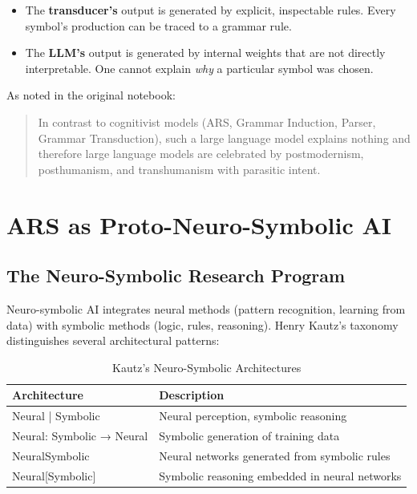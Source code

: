 \documentclass[12pt,a4paper]{article}
\begin{document}
\begin{itemize}
    \item The \textbf{transducer's} output is generated by explicit, inspectable 
    rules. Every symbol's production can be traced to a grammar rule.
    \item The \textbf{LLM's} output is generated by internal weights that are 
    not directly interpretable. One cannot explain \textit{why} a particular 
    symbol was chosen.
\end{itemize}

As noted in the original notebook:

\blockquote{In contrast to cognitivist models (ARS, Grammar Induction, Parser, 
Grammar Transduction), such a large language model explains nothing and 
therefore large language models are celebrated by postmodernism, posthumanism, 
and transhumanism with parasitic intent.}

\section{ARS as Proto-Neuro-Symbolic AI}

\subsection{The Neuro-Symbolic Research Program}

Neuro-symbolic AI integrates neural methods (pattern recognition, learning from 
data) with symbolic methods (logic, rules, reasoning). Henry Kautz's taxonomy 
\citep{kautz2020third} distinguishes several architectural patterns:

\begin{table}[H]
\centering
\caption{Kautz's Neuro-Symbolic Architectures}
\label{tab:kautz}
\begin{tabular}{@{} p{4cm} p{8cm} @{}}
\toprule
\textbf{Architecture} & \textbf{Description} \\
\midrule
Neural | Symbolic & Neural perception, symbolic reasoning \\
Neural: Symbolic → Neural & Symbolic generation of training data \\
NeuralSymbolic & Neural networks generated from symbolic rules \\
Neural[Symbolic] & Symbolic reasoning embedded in neural networks \\
\bottomrule
\end{tabular}
\end{table}
\end{document}
